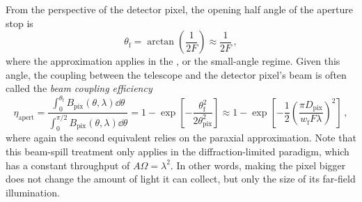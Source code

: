From the perspective of the detector pixel, the opening half angle of the aperture stop is
\begin{equation}
    \theta_{\mathrm{f}} = \arctan \left( \frac{1}{2 F} \right) \approx \frac{1}{2 F}\, ,
    \label{eq:stop_angle}
\end{equation}
where the approximation applies in the , or the small-angle regime. Given this angle, the coupling between the telescope and the detector pixel's beam is often called the \textit{beam coupling efficiency}
\begin{equation}
    \eta_{\mathrm{apert}} = \frac{\int_{0}^{{\theta_{\mathrm{f}}}} B_{\mathrm{pix}}(\theta, \lambda) \dd \theta}{\int_{0}^{{\pi / 2}} B_{\mathrm{pix}}(\theta, \lambda) \dd \theta} = 1 - \exp \left[ -\frac{\theta_{\mathrm{f}}^{2}}{2 \theta_{\mathrm{pix}}^{2}} \right] \approx 1 - \exp \left[ -\frac{1}{2} \left( \frac{\pi D_{\mathrm{pix}}}{w_{\mathrm{f}} F \lambda} \right)^{2} \right] \, ,
    \label{eq:beam_coupling_efficiency}
\end{equation}
where again the second equivalent relies on the paraxial approximation. Note that this beam-spill treatment only applies in the diffraction-limited paradigm, which has a constant throughput of $A \Omega = \lambda^{2}$. In other words, making the pixel bigger does not change the amount of light it can collect, but only the size of its far-field illumination.

